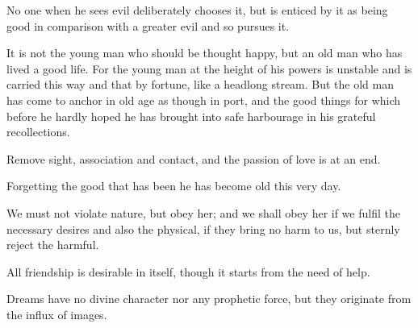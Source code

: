 \documentclass{stex}
\begin{document}
\vspace{0.5em}
\begin{sparagraph}[title=16]
  No one when he sees evil deliberately chooses it, but is enticed by it as being good in comparison with a greater evil and so pursues it.
\end{sparagraph}

\vspace{0.5em}
\begin{sparagraph}[title=17]
  It is not the young man who should be thought happy, but an old man who has lived a good life.
  For the young man at the height of his powers is unstable and is carried this way and that by fortune, like a headlong stream.
  But the old man has come to anchor in old age as though in port, and the good things for which before he hardly hoped he has brought into safe harbourage in his grateful recollections.
\end{sparagraph}

\vspace{0.5em}
\begin{sparagraph}[title=18]
  Remove sight, association and contact, and the passion of love is at an end.
\end{sparagraph}

\vspace{0.5em}
\begin{sparagraph}[title=19]
  Forgetting the good that has been he has become old this very day.
\end{sparagraph}

\vspace{0.5em}
\begin{sparagraph}[title=21]
  We must not violate nature, but obey her; and we shall obey her if we fulfil the necessary desires and also the physical, if they bring no harm to us, but sternly reject the harmful.
\end{sparagraph}

\vspace{0.5em}
\begin{sparagraph}[title=23]
  All friendship is desirable in itself, though it starts from the need of help.
\end{sparagraph}

\vspace{0.5em}
\begin{sparagraph}[title=24]
  Dreams have no divine character nor any prophetic force, but they originate from the influx of images.
\end{sparagraph}
\end{document}
